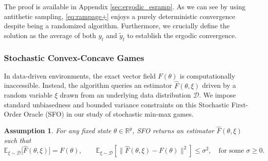 \documentclass[letter,11pt]{article}
\newtheorem{assumption}[]{Assumption}
\begin{document}
The proof is available in Appendix \ref{sec:ergodic_esramp}. As we can see by using antithetic sampling, \eqref{eq:rampage+} enjoys a purely deterministic convergence despite being a randomized algorithm. Furthermore, we crucially define the solution as the average of both $y_t$ and $\tilde{y}_t$ to establish the ergodic convergence.
\subsubsection{Stochastic Convex-Concave Games}
In data-driven environments, the exact vector field $F(\theta)$ is computationally inaccessible. Instead, the algorithm queries an estimator $\hat{F}(\theta, \xi)$ driven by a random variable $\xi$ drawn from an underlying data distribution $\mathcal{D}$. We impose standard unbiasedness and bounded variance constraints on this Stochastic First-Order Oracle (SFO) in our study of stochastic min-max games. 
\begin{assumption}\label{ass:sfo}
For any fixed state $\theta \in \mathbb{R}^p$, SFO returns an estimator $\hat{F}(\theta, \xi)$ such that
\begin{equation}
\mathbb{E}_{\xi \sim \mathcal{D}} \big[ \hat{F}(\theta, \xi) \big] = F(\theta), \qquad \mathbb{E}_{\xi \sim \mathcal{D}} \left[ \|\hat{F}(\theta, \xi) - F(\theta)\|^2 \right] \le \sigma^2, \quad \text{for some }\sigma \ge 0.
\end{equation}
\end{assumption}
\end{document}
